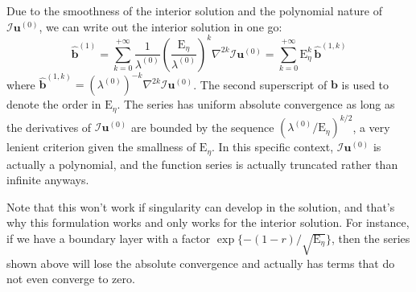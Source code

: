 Due to the smoothness of the interior solution and the polynomial nature of $\mathcal{I} \mathbf{u}^{(0)}$, we can write out the interior solution in one go:
%
\begin{equation}
    \widehat{\mathbf{b}}^{(1)} = \sum_{k=0}^{+\infty} \frac{1}{\lambda^{(0)}} \left(\frac{\mathrm{E}_\eta}{\lambda^{(0)}}\right)^k \nabla^{2k} \mathcal{I}\mathbf{u}^{(0)} = \sum_{k=0}^{+\infty} \mathrm{E}_\eta^k \, \widehat{\mathbf{b}}^{(1,k)}
\end{equation}
%
where $\widehat{\mathbf{b}}^{(1,k)} = (\lambda^{(0)})^{-k} \nabla^{2k} \mathcal{I} \mathbf{u}^{(0)}$. The second superscript of $\mathbf{b}$ is used to denote the order in $\mathrm{E}_\eta$.
The series has uniform absolute convergence as long as the derivatives of $\mathcal{I} \mathbf{u}^{(0)}$ are bounded by the sequence $(\lambda^{(0)}/\mathrm{E}_\eta)^{k/2}$, a very lenient criterion given the smallness of $\mathrm{E}_\eta$. In this specific context, $\mathcal{I}\mathbf{u}^{(0)}$ is actually a polynomial, and the function series is actually truncated rather than infinite anyways.

Note that this won't work if singularity can develop in the solution, and that's why this formulation works and only works for the interior solution. For instance, if we have a boundary layer with a factor $\exp\{-(1-r)/\sqrt{\mathrm{E}_\eta}\}$, then the series shown above will lose the absolute convergence and actually has terms that do not even converge to zero. 

